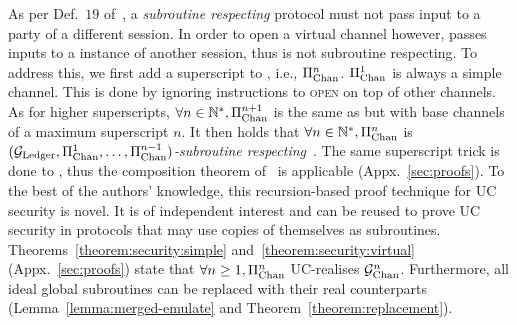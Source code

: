   As per Def.~$19$ of~\cite{cryptoeprint:2000/067}, a
  \emph{subroutine respecting} protocol must not pass input to a party of a
  different session. In order to open a
  virtual channel however, \pchan
  passes inputs to a \pchan instance of another session, thus
  \pchan is not subroutine respecting. To
  address this, we first add a superscript to \pchan, i.e.,
  $\Pi_{\mathrm{Chan}}^{n}$. $\Pi_{\mathrm{Chan}}^{1}$ is always a simple channel.
  This is done by ignoring instructions to \textsc{open} on top of other
  channels. As for higher superscripts, $\forall n \in
  \mathbb{N}^*, \Pi_{\mathrm{Chan}}^{n+1}$ is the same as \pchan but with
  base channels of a maximum superscript $n$. It then holds that $\forall
  n \in \mathbb{N}^*, \Pi_{\mathrm{Chan}}^{n}$ is \emph{$(\mathcal{G}_{\mathrm{Ledger}}, \Pi_{\mathrm{Chan}}^{1}, \dots,
  \Pi_{\mathrm{Chan}}^{n-1})$-subroutine
  respecting}~\cite{DBLP:conf/tcc/BadertscherCHTZ20}. The same superscript
  trick is done to \fchan, thus the composition theorem
  of~\cite{DBLP:conf/tcc/BadertscherCHTZ20} is applicable
  (Appx.~\ref{sec:proofs}). To
  the best of the authors' knowledge, this recursion-based proof technique for
  UC security is novel. It is of independent interest and can be reused to prove
  UC security in protocols that may use copies of themselves as subroutines.
  Theorems~\ref{theorem:security:simple} and~\ref{theorem:security:virtual}
  (Appx.~\ref{sec:proofs}) state
  that $\forall n \geq 1, \Pi_{\mathrm{Chan}}^{n}$ UC-realises $\mathcal{G}_{\mathrm{Chan}}^{n}$. Furthermore,
  all ideal global subroutines can be replaced with their real counterparts
  (Lemma~\ref{lemma:merged-emulate} and Theorem~\ref{theorem:replacement}).
